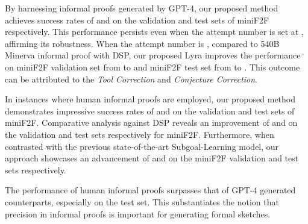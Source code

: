 \documentclass{article} \usepackage{iclr2024_conference,times}
\def\methodOneFull{\textit{Tool Correction}\xspace}
\def\methodTwoFull{\textit{Conjecture Correction}\xspace}
\def\shortname{Lyra\xspace}
\begin{document}
By harnessing informal proofs generated by GPT-4, our proposed method achieves success rates of  and  on the validation and test sets of miniF2F respectively. This performance persists even when the attempt number is set at , affirming its robustness. When the attempt number is , compared to 540B Minerva informal proof with DSP, our proposed \shortname improves the performance on miniF2F validation set from  to  and miniF2F test set from  to . This outcome can be attributed to the \methodOneFull and \methodTwoFull.

In instances where human informal proofs are employed, our proposed method demonstrates impressive success rates of  and  on the validation and test sets of miniF2F. Comparative analysis against DSP reveals an improvement of  and  on the validation and test sets respectively for miniF2F. Furthermore, when contrasted with the previous state-of-the-art Subgoal-Learning model, our approach showcases an advancement of  and  on the miniF2F validation and test sets respectively. 

The performance of human informal proofs surpasses that of GPT-4 generated counterparts, especially on the test set. This substantiates the notion that precision in informal proofs is important for generating formal sketches.
\end{document}
